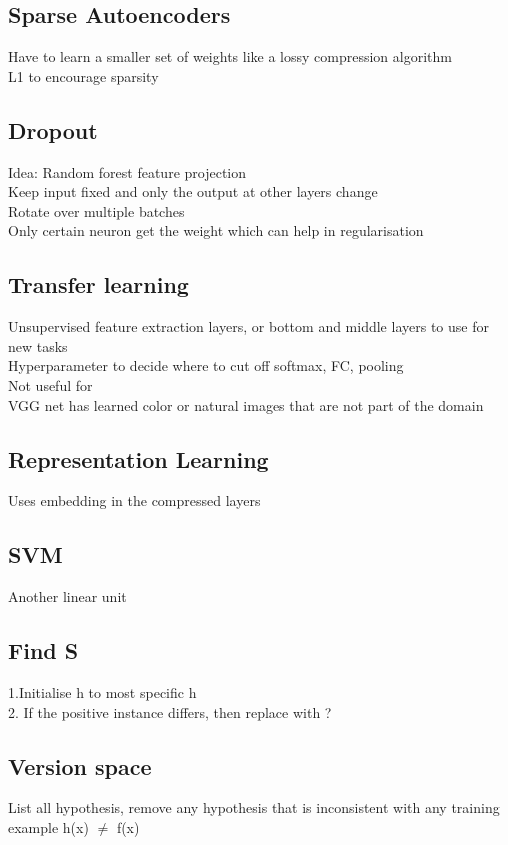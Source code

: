 \documentclass[11pt]{article}
\begin{document}
\subsection*{Sparse Autoencoders}
Have to learn a smaller set of weights like a lossy compression algorithm \\
L1 to encourage sparsity
\subsection*{Dropout}
Idea: Random forest feature projection\\
Keep input fixed and only the output at other layers change\\
Rotate over multiple batches\\
Only certain neuron get the weight which can help in regularisation
\subsection*{Transfer learning}
Unsupervised feature extraction layers, or bottom and middle layers to use for new tasks\\
Hyperparameter to decide where to cut off softmax, FC, pooling
\\
Not useful for\\
VGG net has learned color or natural images that are not part of the domain
\subsection*{Representation Learning}
Uses embedding in the compressed layers
\subsection*{SVM}
Another linear unit
\newpage\noindent
\subsection*{Find S}
1.Initialise h to most specific h\\
2. If the positive instance differs, then replace with ?
\subsection*{Version space}
List all hypothesis, remove any hypothesis that is inconsistent with any training example h(x) $\neq$ f(x)
\end{document}
